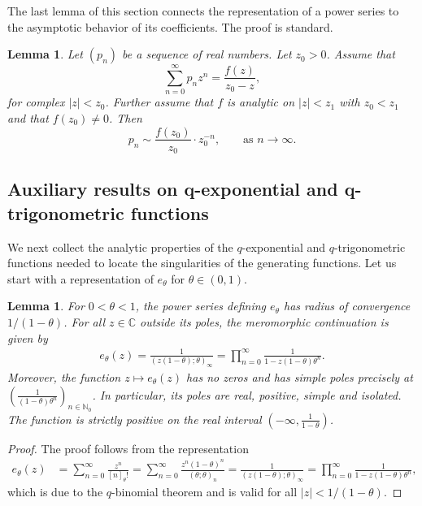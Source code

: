 \documentclass[12pt]{article}
\newcommand{\N}{\mathbb{N}} %
\newcommand{\C}{\mathbb{C}} %
\newcommand{\1}{\mathds{1}}
\theoremstyle{definition}
\theoremstyle{plain}
\newtheorem{Lemma}[definition]{Lemma}
\theoremstyle{remark}
\begin{document}
The last lemma of this section connects the representation of a power series to the asymptotic behavior of its coefficients. The proof is standard.
\begin{Lemma}\label{asymptotic_powerseries}
    Let $(p_n)$ be a sequence of real numbers. Let $z_0>0$. Assume that
\begin{equation}
\sum_{n=0}^\infty p_n z^n = \frac{f(z)}{z_0-z},
\end{equation}
for complex $|z| < z_0$. Further assume that $f$ is analytic on $|z|<z_1$ with $z_0<z_1$ and that $f(z_0)\neq 0$. Then
$$
p_n \sim \frac{f(z_0)}{z_0} \cdot z_0^{-n},\qquad \text{as $n\to\infty$.}
$$
\end{Lemma}
\subsection{Auxiliary results on q-exponential and q-trigonometric functions} \label{sec:auxiliaryqexpetc}
We next collect the analytic properties of the $q$-exponential and $q$-trigonometric functions needed to locate the singularities of the generating functions. Let us start with a representation of $e_\theta$ for $\theta\in(0,1)$.
\begin{Lemma}\label{e_theta_singularities_thetale1}
   For $0<\theta< 1$, the power series defining $e_\theta$ has
radius of convergence $1/(1-\theta)$. For all $z\in\C$ outside its poles, the meromorphic continuation is given by
   \begin{align}\label{e_theta_prod_thetale1}
       e_\theta(z)=\frac{1}{(z(1-\theta);\theta)_\infty}=\prod_{n=0}^\infty\frac{1}{1-z(1-\theta)\theta^n}.
   \end{align}
   Moreover,  the function $z\mapsto e_\theta(z)$ has no zeros and has simple poles precisely at $\left(\frac{1}{(1-\theta)\theta^n}\right)_{n\in\N_0}$. In particular, its poles are real, positive, simple and isolated. The function is strictly positive on the real interval $\left(-\infty,\frac{1}{1-\theta}\right)$.
\end{Lemma}
\begin{proof}
The proof follows from the representation
    \begin{align*}
        e_{\theta}(z)
        &= \sum_{n=0}^\infty \frac{z^{n}}{[n]_{\theta}!}=\sum_{n=0}^\infty\frac{z^n(1-\theta)^n}{(\theta;\theta)_n}=\frac{1}{(z(1-\theta);\theta)_\infty}=\prod_{n=0}^\infty\frac{1}{1-z(1-\theta)\theta^n},
    \end{align*}
    which is due to the $q$-binomial theorem and is valid for all $|z|<1/(1-\theta)$.
\end{proof}
\end{document}
